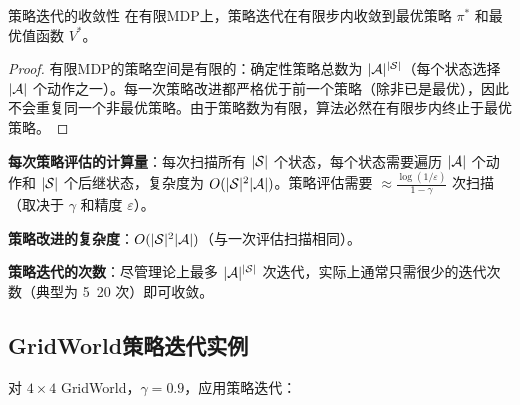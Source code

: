 \begin{myTheorem}{策略迭代的收敛性}
在有限MDP上，策略迭代在有限步内收敛到最优策略 $\pi^{*}$ 和最优值函数 $V^{*}$。
\end{myTheorem}

\begin{proof}
有限MDP的策略空间是有限的：确定性策略总数为 $|\mathcal{A}|^{|\mathcal{S}|}$（每个状态选择 $|\mathcal{A}|$ 个动作之一）。每一次策略改进都严格优于前一个策略（除非已是最优），因此不会重复同一个非最优策略。由于策略数为有限，算法必然在有限步内终止于最优策略。
\end{proof}

\textbf{每次策略评估的计算量}：每次扫描所有 $|\mathcal{S}|$ 个状态，每个状态需要遍历 $|\mathcal{A}|$ 个动作和 $|\mathcal{S}|$ 个后继状态，复杂度为 $O(|\mathcal{S}|^2 |\mathcal{A}|)$。策略评估需要 $\approx \frac{\log(1/\varepsilon)}{1-\gamma}$ 次扫描（取决于 $\gamma$ 和精度 $\varepsilon$）。

\textbf{策略改进的复杂度}：$O(|\mathcal{S}|^2 |\mathcal{A}|)$（与一次评估扫描相同）。

\textbf{策略迭代的次数}：尽管理论上最多 $|\mathcal{A}|^{|\mathcal{S}|}$ 次迭代，实际上通常只需很少的迭代次数（典型为 5~20 次）即可收敛。

\subsection{GridWorld策略迭代实例}

对 $4 \times 4$ GridWorld，$\gamma = 0.9$，应用策略迭代：


